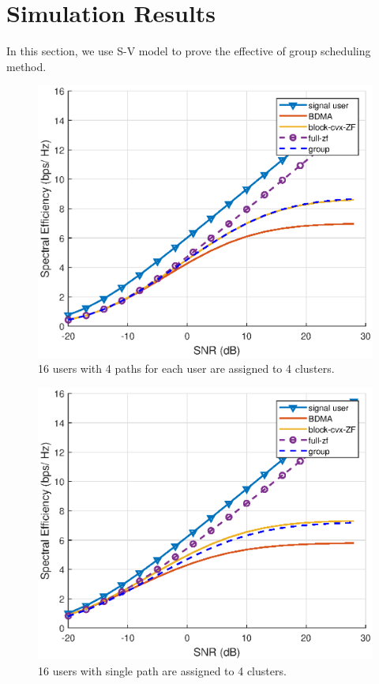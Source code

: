 \documentclass[conference]{IEEEtran}
\begin{document}
\section{Simulation Results}
In this section, we use S-V model to prove the effective of group scheduling method.
\begin{figure}[h]
	\begin{center}
		\includegraphics[scale=0.65]{Figure/16users4pathblock.eps}
		\caption{16 users with 4 paths for each user are assigned to 4 clusters.}\label{fig:16users4pathblock}
	\end{center}
\end{figure}

\begin{figure}[h]
	\begin{center}
		\includegraphics[scale=0.65]{Figure/16singlepath.eps}
		\caption{16 users with single path are assigned to 4 clusters.}\label{fig:16singlepath}
	\end{center}
\end{figure}
\end{document}

